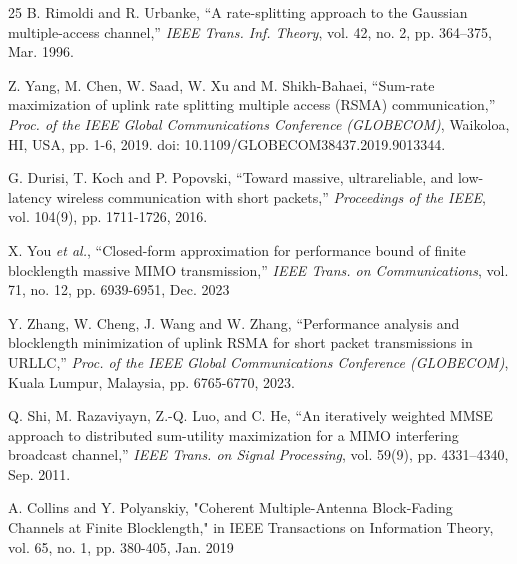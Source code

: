 \documentclass[a4paper, 12pt, onecolumn, journal, twoside, draftclsnofoot]{IEEEtran}
\begin{document}
\begin{thebibliography}{25} 
B. Rimoldi and R. Urbanke, ``A rate-splitting approach to the Gaussian multiple-access channel,'' \emph{IEEE Trans. Inf. Theory},  vol. 42, no. 2, pp. 364–375, Mar. 1996.

Z. Yang, M. Chen, W. Saad, W. Xu and M. Shikh-Bahaei, ``Sum-rate maximization of uplink rate splitting multiple access (RSMA) communication,'' \emph{Proc. of the IEEE Global Communications Conference (GLOBECOM)}, Waikoloa, HI, USA, pp. 1-6, 2019.  doi: 10.1109/GLOBECOM38437.2019.9013344.

G. Durisi, T. Koch and P. Popovski, ``Toward massive, ultrareliable, and low-latency wireless communication with short packets,'' \emph{Proceedings of the IEEE}, vol. 104(9), pp. 1711-1726, 2016.

X. You \emph{et al.}, ``Closed-form approximation for performance bound of finite blocklength massive MIMO transmission,'' \emph{IEEE Trans. on Communications}, vol. 71, no. 12, pp. 6939-6951, Dec. 2023

Y. Zhang, W. Cheng, J. Wang and W. Zhang, ``Performance analysis and blocklength minimization of uplink RSMA for short packet transmissions in URLLC,'' \emph{Proc. of the IEEE Global Communications Conference (GLOBECOM)}, Kuala Lumpur, Malaysia, pp. 6765-6770, 2023.

Q. Shi, M. Razaviyayn, Z.-Q. Luo, and C. He, ``An iteratively weighted MMSE approach to distributed sum-utility maximization for a MIMO interfering broadcast channel,'' \emph{IEEE Trans. on Signal Processing}, vol. 59(9), pp. 4331–4340, Sep. 2011.

A. Collins and Y. Polyanskiy, "Coherent Multiple-Antenna Block-Fading Channels at Finite Blocklength," in IEEE Transactions on Information Theory, vol. 65, no. 1, pp. 380-405, Jan. 2019


\end{thebibliography}
\end{document}
